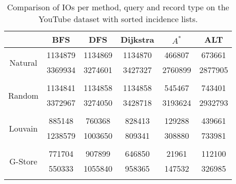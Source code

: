 \begin{table}
	\begin{center}
		 \begin{tabular}[c]{c c c c c c} \toprule
			  & BFS & DFS & Dijkstra & $A^*$  & ALT \\ \midrule 
 			\multirow{2}{*}{Natural}  & 1134879 & 1134869 & 1134870 & 466807 & 673661 \\ 
 				 & 3369934 & 3274601 & 3427327 & 2760899 & 2877905 \\ 
 				&&&&& \\[-0.5em]
 			\multirow{2}{*}{Random}  & 1134841 & 1134858 & 1134858 & 545467 & 743401 \\ 
 				 & 3372967 & 3274050 & 3428718 & 3193624 & 2932793 \\ 
 				&&&&& \\[-0.5em]
 			\multirow{2}{*}{Louvain}  & 885148 & 760368 & 828413 & 129288 & 439661 \\ 
 				 & 1238579 & 1003650 & 809341 & 308880 & 733981 \\ 
 				&&&&& \\[-0.5em]
 			\multirow{2}{*}{G-Store}  & 771704 & 907899 & 646850 & 21961 & 112100 \\ 
 				 & 550333 & 1055840 & 958365 & 147532 & 326985 \\ 
 				&&&&& \\[-0.5em]
 					\end{tabular}  
  	 \end{center}
	 \caption{Comparison of IOs per method, query and record type on the YouTube dataset with sorted incidence lists.}
	 \label{yt-s}
\end{table}
